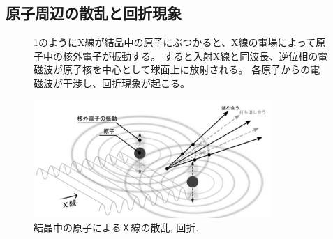 \documentclass[11pt]{ltjsarticle}
\begin{document}
    \subsection*{原子周辺の散乱と回折現象}
    \begin{figure}[H]
      \centering
      \begin{minipage}[t]{0.6\textwidth}
        \vspace{0pt}
        \cref{fig:xrd}のようにX線が結晶中の原子にぶつかると、X線の電場によって原子中の核外電子が振動する。
        すると入射X線と同波長、逆位相の電磁波が原子核を中心として球面上に放射される。
        各原子からの電磁波が干渉し、回折現象が起こる。
      \end{minipage}
      \hfill
      \begin{minipage}[t]{0.35\textwidth}
        \vspace{0pt}
        \centering
        \includegraphics[width=\linewidth]{xrd1.png}
        \caption{結晶中の原子によるＸ線の散乱, 回折.}
        \label{fig:xrd}
      \end{minipage}
    \end{figure}
\end{document}
